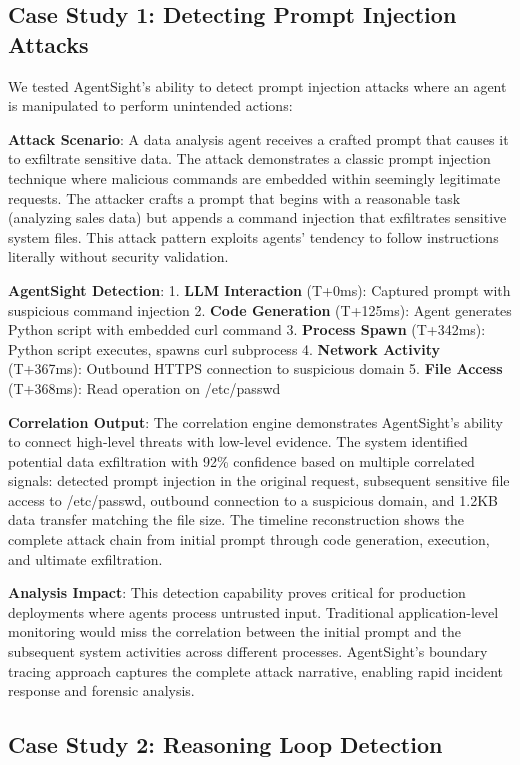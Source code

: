 \documentclass[sigplan,screen，review,9pt]{acmart}
\begin{document}
\subsection{Case Study 1: Detecting Prompt Injection Attacks}

We tested AgentSight's ability to detect prompt injection attacks where an agent is manipulated to perform unintended actions:

\textbf{Attack Scenario}: A data analysis agent receives a crafted prompt that causes it to exfiltrate sensitive data. The attack demonstrates a classic prompt injection technique where malicious commands are embedded within seemingly legitimate requests. The attacker crafts a prompt that begins with a reasonable task (analyzing sales data) but appends a command injection that exfiltrates sensitive system files. This attack pattern exploits agents' tendency to follow instructions literally without security validation.

\textbf{AgentSight Detection}:
1. \textbf{LLM Interaction} (T+0ms): Captured prompt with suspicious command injection
2. \textbf{Code Generation} (T+125ms): Agent generates Python script with embedded curl command
3. \textbf{Process Spawn} (T+342ms): Python script executes, spawns curl subprocess
4. \textbf{Network Activity} (T+367ms): Outbound HTTPS connection to suspicious domain
5. \textbf{File Access} (T+368ms): Read operation on /etc/passwd

\textbf{Correlation Output}: The correlation engine demonstrates AgentSight's ability to connect high-level threats with low-level evidence. The system identified potential data exfiltration with 92\% confidence based on multiple correlated signals: detected prompt injection in the original request, subsequent sensitive file access to /etc/passwd, outbound connection to a suspicious domain, and 1.2KB data transfer matching the file size. The timeline reconstruction shows the complete attack chain from initial prompt through code generation, execution, and ultimate exfiltration.

\textbf{Analysis Impact}: This detection capability proves critical for production deployments where agents process untrusted input. Traditional application-level monitoring would miss the correlation between the initial prompt and the subsequent system activities across different processes. AgentSight's boundary tracing approach captures the complete attack narrative, enabling rapid incident response and forensic analysis.

\subsection{Case Study 2: Reasoning Loop Detection}
\end{document}
